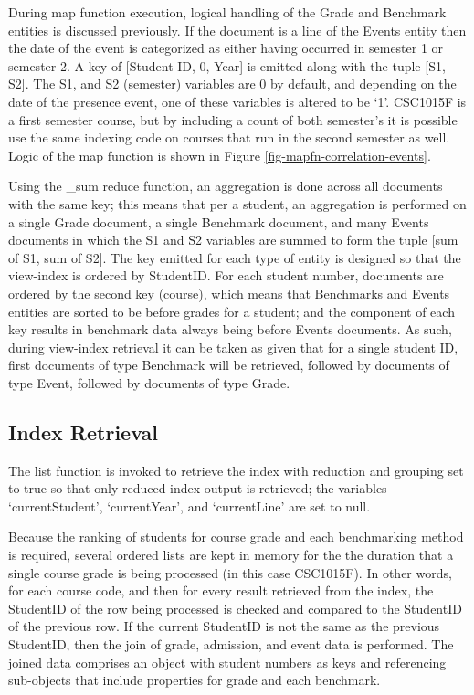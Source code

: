 During map function execution, logical handling of the Grade and Benchmark entities is discussed previously. If the document is a line of the Events entity then the date of the event is categorized as either having occurred in semester 1 or semester 2. A key of [Student ID, 0, Year] is emitted along with the tuple [S1, S2]. The S1, and S2 (semester) variables are 0 by default, and depending on the date of the presence event, one of these variables is altered to be `1'. CSC1015F is a first semester course, but by including a count of both semester's it is possible use the same indexing code on courses that run in the second semester as well. Logic of the map function is shown in Figure \ref{fig-mapfn-correlation-events}.

Using the \_sum reduce function, an aggregation is done across all documents with the same key; this means that per a student, an aggregation is performed on a single Grade document, a single Benchmark document, and many Events documents in which the S1 and S2 variables are summed to form the tuple [sum of S1, sum of S2]. The key emitted for each type of entity is designed so that the view-index is ordered by StudentID. For each student number, documents are ordered by the second key (course), which means that Benchmarks and Events entities are sorted to be before grades for a student; and the  component of each key results in benchmark data always being before Events documents. As such, during view-index retrieval it can be taken as given that for a single student ID, first documents of type Benchmark will be retrieved, followed by documents of type Event, followed by documents of type Grade.



\subsection{Index Retrieval}
The list function is invoked to retrieve the index with reduction and grouping set to true so that only reduced index output is retrieved; the variables `currentStudent', `currentYear', and `currentLine' are set to null.

Because the ranking of students for course grade and each benchmarking method is required, several ordered lists are kept in memory for the the duration that a single course grade is being processed (in this case CSC1015F). In other words, for each course code, and then for every result retrieved from the index, the StudentID of the row being processed is checked and compared to the StudentID of the previous row. If the current StudentID is not the same as the previous StudentID, then the join of grade, admission, and event data is performed. The joined data comprises an object with student numbers as keys and referencing sub-objects that include properties for grade and each benchmark.

